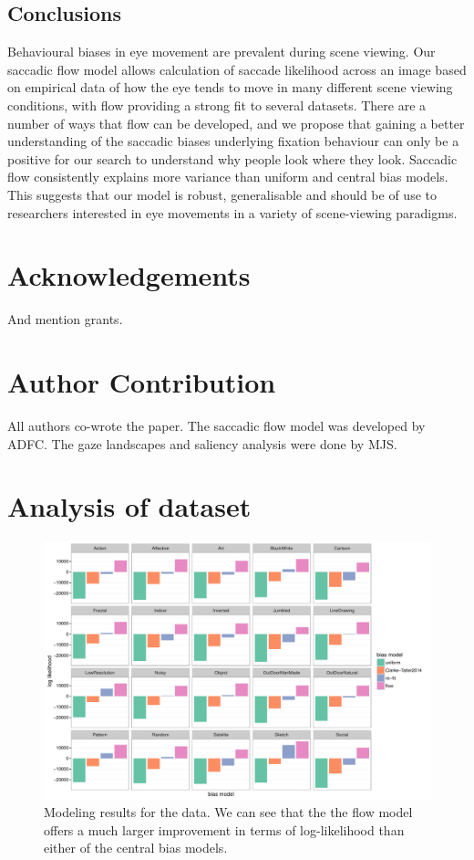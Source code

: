 \documentclass[a4paper, twocolumn, oneside, 11pt]{article}
\begin{document}
\subsection{Conclusions}
Behavioural biases in eye movement are prevalent during scene viewing. Our saccadic flow model allows calculation of saccade likelihood across an image based on empirical data of how the eye tends to move in many different scene viewing conditions, with flow providing a strong fit to several datasets. There are a number of ways that flow can be developed, and we propose that gaining a better understanding of the saccadic biases underlying fixation behaviour can only be a positive for our search to understand why people look where they look. Saccadic flow consistently explains more variance than uniform and central bias models. This suggests that our model is robust, generalisable and should be of use to researchers interested in eye movements in a variety of scene-viewing paradigms. 


\section*{Acknowledgements}

And mention grants. 

\section*{Author Contribution}

All authors co-wrote the paper. The saccadic flow model was developed by ADFC. The gaze landscapes and saliency analysis were done by MJS.

\appendix



\section{Analysis of \cite{borji2015} dataset}


\begin{figure}
\centering
 \includegraphics[width=13cm]{../scripts/flow/figs/llh_Borji.pdf}
\caption{Modeling results for the \cite{borji2015} data. We can see that the the flow model offers a much larger improvement in terms of log-likelihood than either of the central bias models.}
\label{fig:nFlowDevBorji}
\end{figure}


\small

\end{document}
